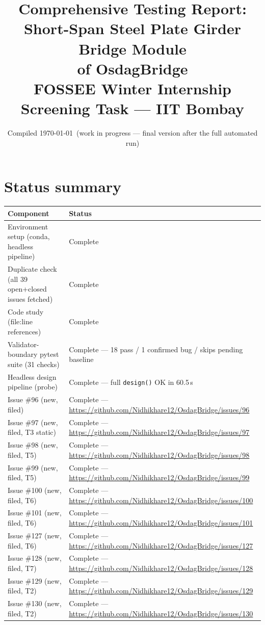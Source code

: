 \documentclass[11pt,a4paper]{article}
\title{\textbf{Comprehensive Testing Report:\\ Short-Span Steel Plate Girder Bridge Module\\ of OsdagBridge}\\[6pt]
\large FOSSEE Winter Internship Screening Task --- IIT Bombay}
\author{}
\date{Compiled \today\ (work in progress --- final version after the full automated run)}
\begin{document}
\maketitle
\thispagestyle{empty}

\section*{Status summary}
\begin{tabular}{@{}ll@{}}
\toprule
Component & Status \\
\midrule
Environment setup (conda, headless pipeline) & Complete \\
Duplicate check (all 39 open+closed issues fetched) & Complete \\
Code study (file:line references) & Complete \\
Validator-boundary pytest suite (31 checks) & Complete --- 18 pass / 1 confirmed bug / skips pending baseline \\
Headless design pipeline (probe) & Complete --- full \texttt{design()} OK in 60.5\,s \\
Issue \#96 (new, filed) & Complete --- \url{https://github.com/Nidhikhare12/OsdagBridge/issues/96} \\
Issue \#97 (new, filed, T3 static) & Complete --- \url{https://github.com/Nidhikhare12/OsdagBridge/issues/97} \\
Issue \#98 (new, filed, T5) & Complete --- \url{https://github.com/Nidhikhare12/OsdagBridge/issues/98} \\
Issue \#99 (new, filed, T5) & Complete --- \url{https://github.com/Nidhikhare12/OsdagBridge/issues/99} \\
Issue \#100 (new, filed, T6) & Complete --- \url{https://github.com/Nidhikhare12/OsdagBridge/issues/100} \\
Issue \#101 (new, filed, T6) & Complete --- \url{https://github.com/Nidhikhare12/OsdagBridge/issues/101} \\
Issue \#127 (new, filed, T6) & Complete --- \url{https://github.com/Nidhikhare12/OsdagBridge/issues/127} \\
Issue \#128 (new, filed, T7) & Complete --- \url{https://github.com/Nidhikhare12/OsdagBridge/issues/128} \\
Issue \#129 (new, filed, T2) & Complete --- \url{https://github.com/Nidhikhare12/OsdagBridge/issues/129} \\
Issue \#130 (new, filed, T2) & Complete --- \url{https://github.com/Nidhikhare12/OsdagBridge/issues/130} \\

\end{tabular}
\end{document}
